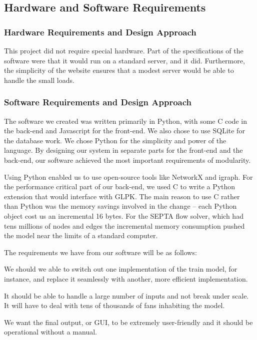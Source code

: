 \subsection{Hardware and Software Requirements}
\subsubsection{Hardware Requirements and Design Approach}
This project did not require special hardware. Part of the
specifications of the software were that it would run on a standard
server, and it did. Furthermore, the simplicity of the website ensures
that a modest server would be able to handle the small loads.

\subsubsection{ Software Requirements and Design Approach}
The software we created was written primarily in Python, with some C
code in the back-end and Javascript for the front-end. We also chose
to use SQLite for the database work. We chose Python for the
simplicity and power of the language. By designing our system in
separate parts for the front-end and the back-end, our software
achieved the most important requirements of modularity.

Using Python enabled us to use open-source tools like
NetworkX\cite{networkx} and igraph\cite{igraph}. For the performance
critical part of our back-end, we used C to write a Python extension
that would interface with GLPK\cite{glpk}. The main reason to use C
rather than Python was the memory savings involved in the change --
each Python object cost us an incremental 16 bytes. For the SEPTA flow
solver, which had tens millions of nodes and edges the incremental
memory consumption pushed the model near the limits of a standard
computer.

The requirements we have from our software will be as follows:
\label{requirements}
\begin{description}[style=nextline]
    \item[Modularity] We should we able to switch out one
  implementation of the train model, for instance, and replace it
  seamlessly with another, more efficient implementation.
    \item[Scalability] It should be able to handle a large number of
  inputs and not break under scale. It will have to deal with tens of
  thousands of fans inhabiting the model.
    \item[User-Friendliness] We want the final output, or GUI, to be
  extremely user-friendly and it should be operational without a
  manual.
\end{description}